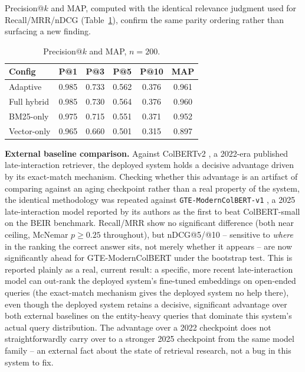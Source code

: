 \documentclass[a4paper,twoside]{article}
\begin{document}
Precision@$k$ and MAP, computed with the identical relevance judgment used for Recall/MRR/nDCG (Table~\ref{tab:precision-map-report}), confirm the same parity ordering rather than surfacing a new finding.

\begin{table}[h]
\caption{Precision@$k$ and MAP, $n=200$.}\label{tab:precision-map-report}\centering
\begin{tabular}{|l|c|c|c|c|c|}
\hline
Config & P@1 & P@3 & P@5 & P@10 & MAP \\
\hline
Adaptive & 0.985 & 0.733 & 0.562 & 0.376 & 0.961 \\
Full hybrid & 0.985 & 0.730 & 0.564 & 0.376 & 0.960 \\
BM25-only & 0.975 & 0.715 & 0.551 & 0.371 & 0.952 \\
Vector-only & 0.965 & 0.660 & 0.501 & 0.315 & 0.897 \\
\hline
\end{tabular}
\end{table}

\textbf{External baseline comparison.} Against ColBERTv2 \citep{santhanam2022colbertv2}, a 2022-era published late-interaction retriever, the deployed system holds a decisive advantage driven by its exact-match mechanism. Checking whether this advantage is an artifact of comparing against an aging checkpoint rather than a real property of the system, the identical methodology was repeated against \texttt{GTE-ModernColBERT-v1} \citep{chaffin2025gtemoderncolbert}, a 2025 late-interaction model reported by its authors as the first to beat ColBERT-small on the BEIR benchmark. Recall/MRR show no significant difference (both near ceiling, McNemar $p\geq0.25$ throughout), but nDCG@5/@10 -- sensitive to \emph{where} in the ranking the correct answer sits, not merely whether it appears -- are now significantly ahead for GTE-ModernColBERT under the bootstrap test. This is reported plainly as a real, current result: a specific, more recent late-interaction model can out-rank the deployed system's fine-tuned embeddings on open-ended queries (the exact-match mechanism gives the deployed system no help there), even though the deployed system retains a decisive, significant advantage over both external baselines on the entity-heavy queries that dominate this system's actual query distribution. The advantage over a 2022 checkpoint does not straightforwardly carry over to a stronger 2025 checkpoint from the same model family -- an external fact about the state of retrieval research, not a bug in this system to fix.
\end{document}
